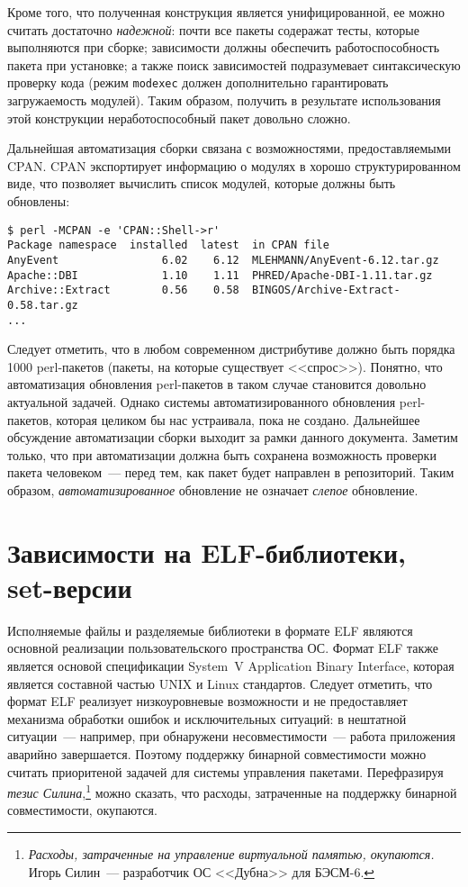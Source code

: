 \documentclass[russian,a4paper,12pt,titlepage]{article}
\begin{document}
Кроме того, что полученная конструкция является унифицированной, ее можно считать достаточно \emph{надежной}:
почти все пакеты содеражат тесты, которые выполняются при сборке; зависимости должны обеспечить
работоспособность пакета при установке; а также поиск зависимостей подразумевает синтаксическую проверку кода
(режим \verb|modexec| должен дополнительно гарантировать загружаемость модулей).
Таким образом, получить в результате использования этой конструкции неработоспособный пакет довольно сложно.

Дальнейшая автоматизация сборки связана с возможностями, предоставляемыми CPAN.
CPAN экспортирует информацию о модулях в хорошо структурированном виде, что позволяет
вычислить список модулей, которые должны быть обновлены:
\begin{verbatim}
$ perl -MCPAN -e 'CPAN::Shell->r'
Package namespace  installed  latest  in CPAN file
AnyEvent                6.02    6.12  MLEHMANN/AnyEvent-6.12.tar.gz
Apache::DBI             1.10    1.11  PHRED/Apache-DBI-1.11.tar.gz
Archive::Extract        0.56    0.58  BINGOS/Archive-Extract-0.58.tar.gz
...
\end{verbatim}

Следует отметить, что в любом современном дистрибутиве должно быть порядка 1000 perl-пакетов (пакеты, на которые существует <<спрос>>).
Понятно, что автоматизация обновления perl-пакетов в таком случае становится довольно актуальной задачей.  Однако системы
автоматизированного обновления perl-пакетов, которая целиком бы нас устраивала, пока не создано.
Дальнейшее обсуждение автоматизации сборки выходит за рамки данного документа.  Заметим только, что при автоматизации
должна быть сохранена возможность проверки пакета человеком~--- перед тем, как пакет будет направлен в репозиторий.
Таким образом, \emph{автоматизированное} обновление не означает \emph{слепое} обновление.

\section{Зависимости на ELF-библиотеки, set-версии}
Исполняемые файлы и разделяемые библиотеки в формате ELF являются основной реализации пользовательского пространства ОС.
Формат ELF также является основой спецификации System~V Application Binary Interface, которая является составной частью
UNIX и Linux стандартов.  Следует отметить, что формат ELF реализует низкоуровневые возможности и не предоставляет механизма
обработки ошибок и исключительных ситуаций: в нештатной ситуации~--- например, при обнаружени несовместимости~--- работа
приложения аварийно завершается.  Поэтому поддержку бинарной совместимости можно считать приоритеной задачей для системы
управления пакетами.  Перефразируя
\emph{тезис Силина},\footnote{\textit{Расходы, затраченные на управление виртуальной памятью, окупаются.}
Игорь Силин~--- разработчик ОС <<Дубна>> для БЭСМ-6.}
можно сказать, что расходы, затраченные на поддержку бинарной совместимости, окупаются.
\end{document}

